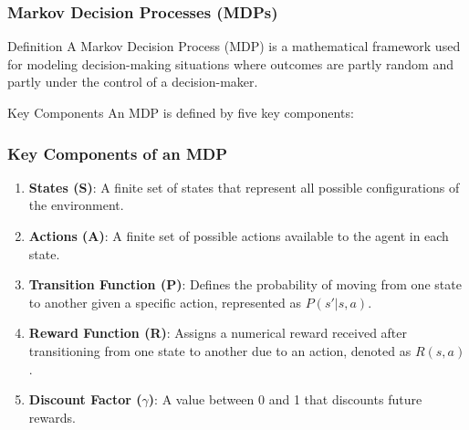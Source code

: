 \documentclass[aspectratio=169]{beamer}
\begin{document}
\begin{frame}[fragile]
  \frametitle{Markov Decision Processes (MDPs)}
  
  \begin{block}{Definition}
    A Markov Decision Process (MDP) is a mathematical framework used for modeling decision-making situations where outcomes are partly random and partly under the control of a decision-maker.
  \end{block}
  
  \begin{block}{Key Components}
    An MDP is defined by five key components:
  \end{block}
\end{frame}

\begin{frame}[fragile]
  \frametitle{Key Components of an MDP}
  
  \begin{enumerate}
    \item \textbf{States (S)}: A finite set of states that represent all possible configurations of the environment.
    \item \textbf{Actions (A)}: A finite set of possible actions available to the agent in each state.
    \item \textbf{Transition Function (P)}: Defines the probability of moving from one state to another given a specific action, represented as \( P(s'|s, a) \).
    \item \textbf{Reward Function (R)}: Assigns a numerical reward received after transitioning from one state to another due to an action, denoted as \( R(s, a) \).
    \item \textbf{Discount Factor ($\gamma$)}: A value between 0 and 1 that discounts future rewards.
  \end{enumerate}
\end{frame}
\end{document}
